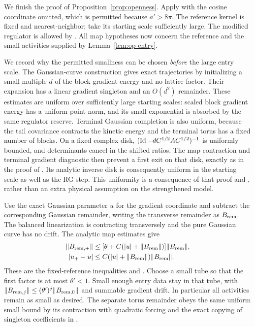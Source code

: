 We finish the proof of Proposition~\ref{prop:openness}.
Apply  with the cosine coordinate omitted,
which is permitted because \(a'>8\pi\).  The reference
kernel is fixed and nearest-neighbor; take its starting
scale sufficiently large.  The modified regulator is
allowed by .  All map hypotheses now
concern the reference and the small activities supplied
by Lemma~\ref{lem:op-entry}.

We record why the permitted smallness can be chosen
\emph{before} the large entry scale.  The Gaussian-curve
construction  gives exact
trajectories by initializing a small multiple \(d\)
of the block gradient energy and no lattice factor.
Their expansion has a linear gradient singleton and
an \(O(d^2)\) remainder.  These estimates are uniform
over sufficiently large starting scales: scaled block
gradient energy has a uniform point norm, and its
small exponential is absorbed by the same regulator
reserve.  Terminal Gaussian completion is also uniform,
because the tail covariance contracts the kinetic
energy and the terminal torus has a fixed number of
blocks.  On a fixed complex disk,
\((\operatorname{Id}-dC^{1/2}AC^{1/2})^{-1}\) is uniformly bounded,
and determinants cancel in the shifted ratios.
The map contraction and terminal gradient diagnostic
then prevent a first exit on that disk, exactly as
in the proof of .  Its
analytic inverse disk is consequently uniform in
the starting scale as well as the RG step.  This
uniformity is a consequence of that proof and
, rather than an extra physical
assumption on the strengthened model.

Use the exact Gaussian parameter \(u\) for the
gradient coordinate and subtract the corresponding
Gaussian remainder, writing the transverse remainder
as \(B_{\rm rem}\).  The balanced linearization is
contracting transversely and the pure Gaussian curve
has no drift.  The analytic map estimates give
\begin{align}
 \lVert B_{{\rm rem},+}\rVert
 &\leq[\theta+C(|u|+\lVert B_{\rm rem}\rVert)]
                                      \lVert B_{\rm rem}\rVert,\label{eq:op-gapped-B}\\
 |u_+-u|
 &\leq C(|u|+\lVert B_{\rm rem}\rVert)
                                      \lVert B_{\rm rem}\rVert.\label{eq:op-gapped-u}
\end{align}
These are the fixed-reference inequalities
 and .
Choose a small tube so that the first factor is at
most \(\theta'<1\).  Small enough entry data stay
in that tube, with
\(\lVert B_{{\rm rem},j}\rVert\leq
(\theta')^j\lVert B_{{\rm rem},0}\rVert\) and summable
gradient drift.  In particular all activities
remain as small as desired.  The separate torus
remainder obeys the same uniform small bound by
its contraction with quadratic forcing and the
exact copying of singleton coefficients in
.


